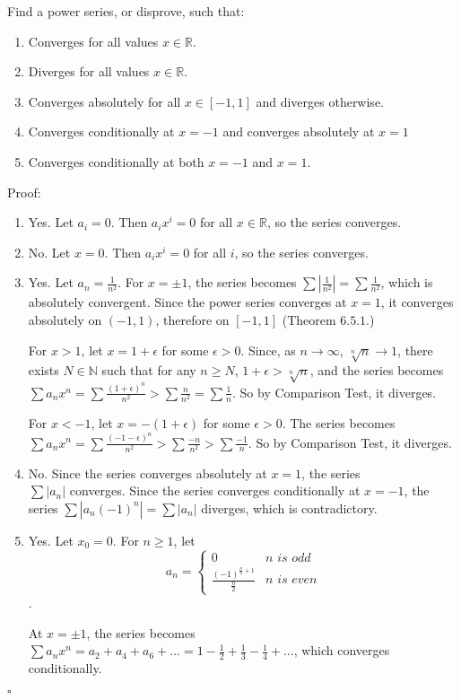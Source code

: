 \documentclass{article}
\begin{document}
Find a power series, or disprove, such that:

\begin{enumerate}
\item Converges for all values $x\in\mathbb{R}$.
\item Diverges for all values $x\in\mathbb{R}$.
\item Converges absolutely for all $x\in[-1,1]$ and diverges otherwise.
\item Converges conditionally at $x=-1$ and converges absolutely at $x=1$
\item Converges conditionally at both $x=-1$ and $x=1$.
\end{enumerate}

Proof:

\begin{enumerate}
    \item Yes. Let $a_i = 0$. Then $a_ix^i = 0$ for all $x \in \mathbb{R}$, so the series converges.
    
    \item No. Let $x = 0$. Then $a_ix^i = 0$ for all $i$, so the series converges.
    
    \item Yes. Let $a_n = \frac{1}{n^2}$. For $x=\pm 1$, the series becomes $\sum |\frac{1}{n^2}| = \sum \frac{1}{n^2}$, which is absolutely convergent. Since the power series converges at $x=1$, it converges absolutely on $(-1,1)$, therefore on $[-1,1]$ (Theorem $6.5.1$.)
    
    For $x > 1$, let $x = 1 + \epsilon$ for some $\epsilon > 0$. Since, as $n \to \infty$, $\sqrt[n]{n} \to 1$, there exists $N \in \mathbb{N}$ such that for any $n \geq N$, $1+\epsilon > \sqrt[n]{n}$, and the series becomes $\sum a_nx^n = \sum \frac{(1+\epsilon)^n}{n^2} > \sum \frac{n}{n^2} = \sum \frac{1}{n}$. So by Comparison Test, it diverges.

    For $x < -1$, let $x = -(1+\epsilon)$ for some $\epsilon > 0$. The series becomes $\sum a_nx^n = \sum \frac{(-1-\epsilon)^n}{n^2} > \sum \frac{-n}{n^2} > \sum \frac{-1}{n}$. So by Comparison Test, it diverges.
    
    \item No. Since the series converges absolutely at $x=1$, the series \\$\sum |a_n|$ converges. Since the series converges conditionally at $x=-1$, the series $\sum|a_n(-1)^n| = \sum|a_n|$ diverges, which is contradictory.
    \item Yes. Let $x_0 = 0$. For $n \geq 1$, let \[a_n = \begin{cases}0 & n \textit{ is odd} \\ \frac{(-1)^{\frac{n}{2}+1}}{\frac{n}{2}}& n \textit{ is even}\end{cases}\]. 
    
    At $x= \pm1$, the series becomes $\sum a_nx^n = a_2+a_4+a_6 + \dots =  1 - \frac{1}{2} + \frac{1}{3} - \frac{1}{4} + \dots$, which converges conditionally.
\end{enumerate}
$\square$
\end{document}
